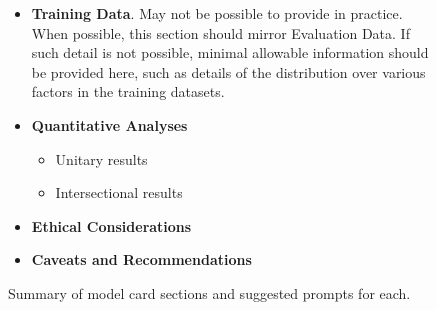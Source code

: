 \begin{figure}
\begin{framed}
\begin{itemize}[leftmargin=*]
\begin{itemize}
\item Datasets
\item Motivation
\item Preprocessing
\end{itemize}
\item {\bf Training Data}.  May not be possible to provide in practice.  When possible, this section should mirror Evaluation Data.  If such detail is not possible, minimal allowable information should be provided here, such as details of the distribution over various factors in the training datasets.
\item {\bf Quantitative Analyses}
\begin{itemize}
\item Unitary results
\item Intersectional results
\end{itemize}
\item {\bf Ethical Considerations}
\item {\bf Caveats and Recommendations}
\vspace{-.25em}
\end{itemize}
\end{framed}
\vspace{-1em}
\caption{Summary of model card sections and suggested prompts for each.}\label{fig:model_sections}
\vspace{-1em}
\end{figure}
